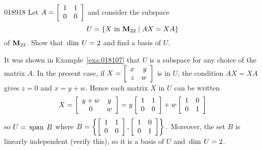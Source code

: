 \begin{example}{}{018918}
Let $A = 
\left[ \begin{array}{rr}
1 & 1 \\
0 & 0
\end{array} \right]$ and consider the subspace
\begin{equation*}
U = \{X \mbox{ in } \textbf{M}_{22} \mid AX = XA \}
\end{equation*}
of $\textbf{M}_{22}$. Show that $\thinspace\operatorname{dim\medspace} U = 2$ and find a basis of $U$.

\begin{solution}
It was shown in Example~\ref{exa:018107} that $U$ is a subspace for any choice of the matrix $A$. In the present case, if $X = 
\left[ \begin{array}{rr}
x & y \\
z & w
\end{array} \right]$
 is in $U$, the condition $AX = XA$ gives $z = 0$ and $x = y + w$. Hence each matrix $X$ in $U$ can be written
\begin{equation*}
X = 
\left[ \begin{array}{cc}
y + w & y \\
0 & w
\end{array} \right]
= y
\left[ \begin{array}{rrr}
1 & 1 \\
0 & 0
\end{array} \right]
+ w
\left[ \begin{array}{rrr}
1 & 0 \\
0 & 1
\end{array} \right]
\end{equation*}
so $U = \thinspace\operatorname{span\medspace} B$ where 
$B = 
\left\{
\left[ \begin{array}{rrr}
1 & 1 \\
0 & 0
\end{array} \right]
, 
\left[ \begin{array}{rrr}
1 & 0 \\
0 & 1
\end{array} \right]
\right\}.$
 Moreover, the set $B$ is linearly independent (verify this), so it is a basis of $U$ and $\thinspace\operatorname{dim\medspace} U = 2$.
\end{solution}
\end{example}

